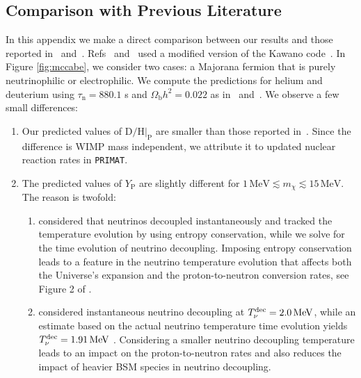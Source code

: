 \subsection{Comparison with Previous Literature}\vspace{-0.2cm} \label{app:ComparisonsLiterature}
In this appendix we make a direct comparison between our results and those reported in~\cite{Nollett:2013pwa} and~\cite{Nollett:2014lwa}. Refs~\cite{Nollett:2013pwa} and~\cite{Nollett:2014lwa} used a modified version of the Kawano code~\cite{Kawano:1988vh,Kawano:1992ua}. In Figure \ref{fig:mccabe}, we consider two cases: a Majorana fermion that is purely neutrinophilic or electrophilic. We compute the predictions for helium and deuterium using $\tau_{\mathrm{n}} =  880.1$ s and $\Omega_{\mathrm{b}}h^2 = 0.022 $ as in~\cite{Nollett:2013pwa} and~\cite{Nollett:2014lwa}. We observe a few small differences:
\begin{enumerate}[leftmargin=0.5cm,itemsep=0pt]\vspace{-0.1cm}
    \item Our predicted values of $\mathrm{D}/\mathrm{H}|_{\mathrm{P}}$ are smaller than those reported in~\cite{Nollett:2013pwa,Nollett:2014lwa}. Since the difference is WIMP mass independent, we attribute it to updated nuclear reaction rates in \texttt{PRIMAT}. 
    \item The predicted values of $Y_{\mathrm{P}}$ are slightly different for $ 1 \,\text{MeV} \lesssim   m_{\chi} \lesssim 15 \,\text{MeV}$. The reason is twofold:
    \begin{enumerate}[leftmargin=0.5cm,itemsep=0pt]\vspace{-0.1cm}
    \item \cite{Nollett:2013pwa,Nollett:2014lwa} considered that neutrinos decoupled instantaneously and tracked the temperature evolution by using entropy conservation, while we solve for the time evolution of neutrino decoupling. Imposing entropy conservation leads to a feature in the neutrino temperature evolution that affects both the Universe's expansion and the proton-to-neutron conversion rates, see Figure 2 of \cite{Escudero:2018mvt}.
    \item \cite{Nollett:2013pwa,Nollett:2014lwa} considered instantaneous neutrino decoupling at $T_\nu^{\rm dec} = 2.0\,\text{MeV}$, while an estimate based on the actual neutrino temperature time evolution yields $T_\nu^{\rm dec} = 1.91\,\text{MeV}$ \cite{Escudero:2018mvt}. Considering a smaller neutrino decoupling temperature leads to an impact on the proton-to-neutron rates and also reduces the impact of heavier BSM species in neutrino decoupling. 
    \end{enumerate}
\end{enumerate}\vspace{-0.1cm}
